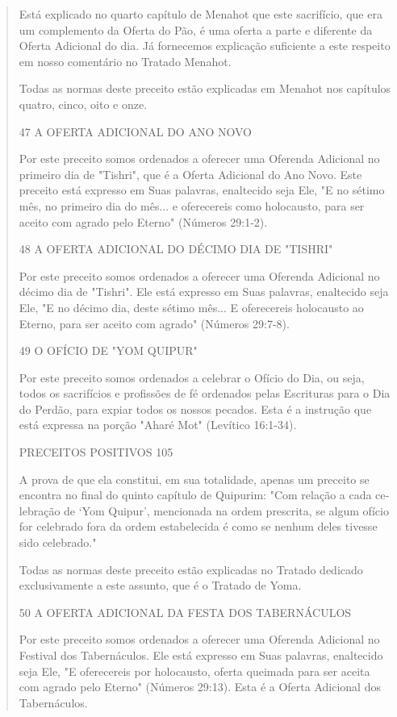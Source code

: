 \begin{quote}
Está explicado no quarto capítulo de Menahot que este sacrifício, que
era um complemento da Oferta do Pão, é uma oferta a parte e diferente da
Oferta Adicional do dia. Já fornecemos explicação suficiente a este
respeito em nosso comentário no Tratado Menahot.

Todas as normas deste preceito estão explicadas em Menahot nos capítulos
quatro, cinco, oito e onze.

47 A OFERTA ADICIONAL DO ANO NOVO

Por este preceito somos ordenados a oferecer uma Oferenda Adi­cional no
primeiro dia de "Tishri", que é a Oferta Adicional do Ano Novo. Este
preceito está expresso em Suas palavras, enaltecido seja Ele, "E no
sétimo mês, no primeiro dia do mês... e oferecereis como holocausto,
para ser aceito com agrado pelo Eterno" (Números 29:1-2).

48 A OFERTA ADICIONAL DO DÉCIMO DIA DE "TISHRI"

Por este preceito somos ordenados a oferecer uma Oferenda Adi­cional no
décimo dia de "Tishri". Ele está expresso em Suas palavras, enalteci­do
seja Ele, "E no décimo dia, deste sétimo mês... E oferecereis holocausto
ao Eterno, para ser aceito com agrado" (Números 29:7-8).

49 O OFÍCIO DE "YOM QUIPUR"

Por este preceito somos ordenados a celebrar o Ofício do Dia, ou seja,
todos os sacrifícios e profissões de fé ordenados pelas Escrituras para
o Dia do Perdão, para expiar todos os nossos pecados. Esta é a instrução
que está expressa na porção "Aharé Mot" (Levítico 16:1-34).

PRECEITOS POSITIVOS 105

A prova de que ela constitui, em sua totalidade, apenas um preceito se
encontra no final do quinto capítulo de Quipurim: "Com relação a cada
ce­lebração de `Yom Quipur', mencionada na ordem prescrita, se algum
ofício for celebrado fora da ordem estabelecida é como se nenhum deles
tivesse sido ce­lebrado."

Todas as normas deste preceito estão explicadas no Tratado dedica­do
exclusivamente a este assunto, que é o Tratado de Yoma.

50 A OFERTA ADICIONAL DA FESTA DOS TABERNÁCULOS

Por este preceito somos ordenados a oferecer uma Oferenda Adi­cional no
Festival dos Tabernáculos. Ele está expresso em Suas palavras,
enal­tecido seja Ele, "E oferecereis por holocausto, oferta queimada
para ser aceita com agrado pelo Eterno" (Números 29:13). Esta é a Oferta
Adicional dos Ta­bernáculos.


\end{quote}
